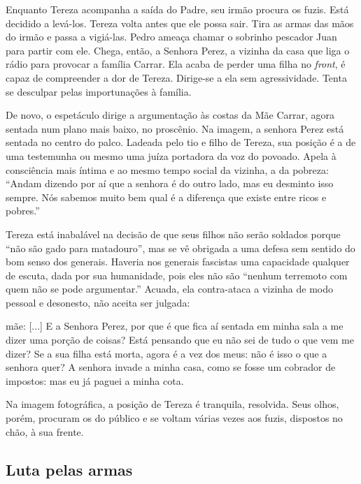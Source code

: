 Enquanto Tereza acompanha a saída do Padre, seu irmão procura os fuzis.
Está decidido a levá-los. Tereza volta antes que ele possa sair. Tira as
armas das mãos do irmão e passa a vigiá-las. Pedro ameaça chamar o
sobrinho pescador Juan para partir com ele. Chega, então, a Senhora
Perez, a vizinha da casa que liga o rádio para provocar a família
Carrar. Ela acaba de perder uma filha no {\it front}, é capaz de
compreender a dor de Tereza. Dirige-se a ela sem agressividade. Tenta se
desculpar pelas importunações à família.

De novo, o espetáculo dirige a argumentação às costas da Mãe Carrar,
agora sentada num plano mais baixo, no proscênio. Na imagem, a senhora
Perez está sentada no centro do palco. Ladeada pelo tio e filho de
Tereza, sua posição é a de uma testemunha ou mesmo uma juíza portadora
da voz do povoado. Apela à consciência mais íntima e ao mesmo tempo
social da vizinha, a da pobreza: “Andam dizendo por aí que a senhora é
do outro lado, mas eu desminto isso sempre. Nós sabemos muito bem qual é
a diferença que existe entre ricos e pobres.”

Tereza está inabalável na decisão de que seus filhos não serão soldados
porque “não são gado para matadouro”, mas se vê obrigada a uma defesa
sem sentido do bom senso dos generais. Haveria nos generais fascistas
uma capacidade qualquer de escuta, dada por sua humanidade, pois eles
não são “nenhum terremoto com quem não se pode argumentar.” Acuada, ela
contra-ataca a vizinha de modo pessoal e desonesto, não aceita ser
julgada:

{\sc mãe}: {[}...{]} E a Senhora Perez, por que é que fica aí sentada em
minha sala a me dizer uma porção de coisas? Está pensando que eu não sei
de tudo o que vem me dizer? Se a sua filha está morta, agora é a vez dos
meus: não é isso o que a senhora quer? A senhora invade a minha casa,
como se fosse um cobrador de impostos: mas eu já paguei a minha cota.

Na imagem fotográfica, a posição de Tereza é tranquila, resolvida. Seus
olhos, porém, procuram os do público e se voltam várias vezes aos fuzis,
dispostos no chão, à sua frente.


\subsection{Luta pelas armas}

